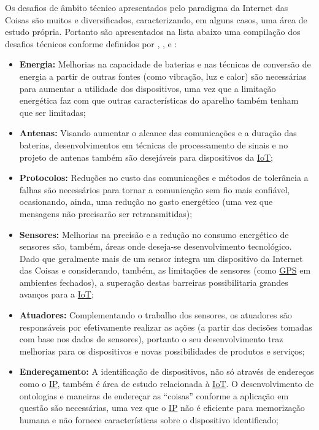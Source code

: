 \documentclass[twoside,english,brazilian]{UNISINOSmonografia}
\begin{document}
Os desafios de âmbito técnico apresentados pelo paradigma da Internet das 
Coisas são muitos e diversificados, caracterizando, em alguns casos, uma área de 
estudo própria. Portanto são apresentados na lista abaixo uma compilação dos 
desafios técnicos conforme definidos por 
, 
, 
 e 
:

\begin{itemize}
	
	\item \textbf{Energia:}
Melhorias na capacidade de baterias e nas técnicas de conversão de energia a 
partir de outras fontes (como vibração, luz e calor) são necessárias para 
aumentar a utilidade dos dispositivos, uma vez que a limitação energética faz 
com que outras características do aparelho também tenham que ser limitadas;
	
	\item \textbf{Antenas:}
Visando aumentar o alcance das comunicações e a duração das baterias, 
desenvolvimentos em técnicas de processamento de sinais e no projeto de 
antenas também são desejáveis para dispositivos da \hyperref[siglas]{IoT};
	
	\item \textbf{Protocolos:}
Reduções no custo das comunicações e métodos de tolerância a falhas são 
necessários para tornar a comunicação sem fio mais confiável, ocasionando,
ainda, uma redução no gasto energético (uma vez que mensagens não 
precisarão ser retransmitidas);
	
	\item \textbf{Sensores:}
Melhorias na precisão e a redução no consumo energético de sensores são, também, 
áreas onde deseja-se desenvolvimento tecnológico. Dado que geralmente mais de 
um sensor integra um dispositivo da Internet das Coisas e considerando, também,
as limitações de sensores (como \hyperref[siglas]{GPS} em ambientes fechados), 
a superação destas barreiras possibilitaria grandes avanços para a \hyperref[siglas]{IoT};
	
	\item \textbf{Atuadores:}
Complementando o trabalho dos sensores, os atuadores são responsáveis por 
efetivamente realizar as ações (a partir das decisões tomadas com base nos 
dados de sensores), portanto o seu desenvolvimento traz melhorias para os 
dispositivos e novas possibilidades de produtos e serviços;
	
	\item \textbf{Endereçamento:}
A identificação de dispositivos, não só através de endereços como o \hyperref[siglas]{IP}, também 
é área de estudo relacionada à \hyperref[siglas]{IoT}. O desenvolvimento de ontologias e maneiras 
de endereçar as ``coisas'' conforme a aplicação em questão são necessárias, 
uma vez que o \hyperref[siglas]{IP} não é eficiente para memorização humana
e não fornece características sobre o dispositivo identificado;
	

\end{itemize}
\end{document}
